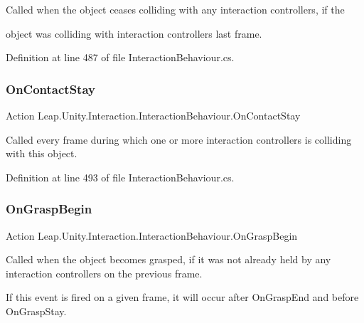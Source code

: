 Called when the object ceases colliding with any interaction controllers, if the 

object was colliding with interaction controllers last frame. 

Definition at line 487 of file Interaction\+Behaviour.\+cs.

\mbox{\label{class_leap_1_1_unity_1_1_interaction_1_1_interaction_behaviour_a3c7b7197c53f70e06444f114d4cf7a1e}} 
\subsubsection{\texorpdfstring{OnContactStay}{OnContactStay}}
{\footnotesize\ttfamily Action Leap.\+Unity.\+Interaction.\+Interaction\+Behaviour.\+On\+Contact\+Stay}



Called every frame during which one or more interaction controllers is colliding with this object. 



Definition at line 493 of file Interaction\+Behaviour.\+cs.

\mbox{\label{class_leap_1_1_unity_1_1_interaction_1_1_interaction_behaviour_a2d1393f9aa91a358e24fa6919eb09265}} 
\subsubsection{\texorpdfstring{OnGraspBegin}{OnGraspBegin}}
{\footnotesize\ttfamily Action Leap.\+Unity.\+Interaction.\+Interaction\+Behaviour.\+On\+Grasp\+Begin}



Called when the object becomes grasped, if it was not already held by any interaction controllers on the previous frame. 

If this event is fired on a given frame, it will occur after On\+Grasp\+End and before On\+Grasp\+Stay. 

